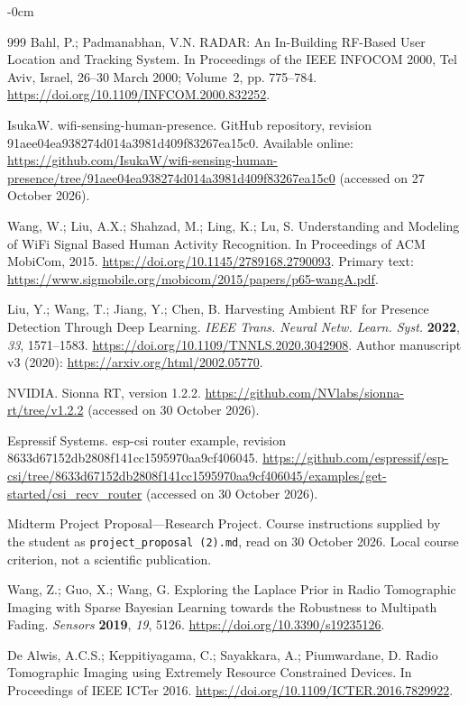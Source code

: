 \documentclass[sensors,article,submit,oneauthor]{Definitions/mdpi}
\begin{document}
\begin{adjustwidth}{-\extralength}{0cm}
{\begin{thebibliography}{999}
Bahl, P.; Padmanabhan, V.N. RADAR: An In-Building RF-Based User Location and Tracking System. In Proceedings of the IEEE INFOCOM 2000, Tel Aviv, Israel, 26--30 March 2000; Volume~2, pp. 775--784. \url{https://doi.org/10.1109/INFCOM.2000.832252}.


IsukaW. wifi-sensing-human-presence. GitHub repository, revision 91aee04ea938274d014a3981d409f83267ea15c0. Available online: \url{https://github.com/IsukaW/wifi-sensing-human-presence/tree/91aee04ea938274d014a3981d409f83267ea15c0} (accessed on 27 October 2026).

Wang, W.; Liu, A.X.; Shahzad, M.; Ling, K.; Lu, S. Understanding and Modeling of WiFi Signal Based Human Activity Recognition. In Proceedings of ACM MobiCom, 2015. \url{https://doi.org/10.1145/2789168.2790093}. Primary text: \url{https://www.sigmobile.org/mobicom/2015/papers/p65-wangA.pdf}.

Liu, Y.; Wang, T.; Jiang, Y.; Chen, B. Harvesting Ambient RF for Presence Detection Through Deep Learning. {\em IEEE Trans. Neural Netw. Learn. Syst.} {\bf 2022}, {\em 33}, 1571--1583. \url{https://doi.org/10.1109/TNNLS.2020.3042908}. Author manuscript v3 (2020): \url{https://arxiv.org/html/2002.05770}.

NVIDIA. Sionna RT, version 1.2.2. \url{https://github.com/NVlabs/sionna-rt/tree/v1.2.2} (accessed on 30 October 2026).

Espressif Systems. esp-csi router example, revision 8633d67152db2808f141cc1595970aa9cf406045. \url{https://github.com/espressif/esp-csi/tree/8633d67152db2808f141cc1595970aa9cf406045/examples/get-started/csi_recv_router} (accessed on 30 October 2026).

Midterm Project Proposal---Research Project. Course instructions supplied by the student as \texttt{project\_proposal (2).md}, read on 30 October 2026. Local course criterion, not a scientific publication.

Wang, Z.; Guo, X.; Wang, G. Exploring the Laplace Prior in Radio Tomographic Imaging with Sparse Bayesian Learning towards the Robustness to Multipath Fading. {\em Sensors} {\bf 2019}, {\em 19}, 5126. \url{https://doi.org/10.3390/s19235126}.

De Alwis, A.C.S.; Keppitiyagama, C.; Sayakkara, A.; Piumwardane, D. Radio Tomographic Imaging using Extremely Resource Constrained Devices. In Proceedings of IEEE ICTer 2016. \url{https://doi.org/10.1109/ICTER.2016.7829922}.


\end{thebibliography}}
\end{adjustwidth}
\end{document}
